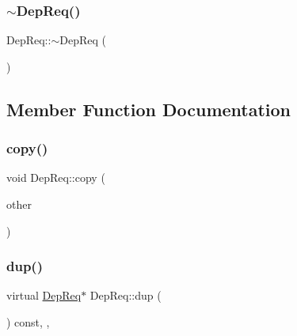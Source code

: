 \subsubsection{\texorpdfstring{$\sim$\+Dep\+Req()}{~DepReq()}}
{\footnotesize\ttfamily Dep\+Req\+::$\sim$\+Dep\+Req (\begin{DoxyParamCaption}{ }\end{DoxyParamCaption})\hspace{0.3cm}{\ttfamily [virtual]}}



\subsection{Member Function Documentation}
\mbox{\label{class_dep_req_a3ec88f2216d73f6b499ae6653a60437b}} 
\subsubsection{\texorpdfstring{copy()}{copy()}}
{\footnotesize\ttfamily void Dep\+Req\+::copy (\begin{DoxyParamCaption}\item[{const \hyperlink{class_dep_req}{Dep\+Req} \&}]{other }\end{DoxyParamCaption})\hspace{0.3cm}{\ttfamily [private]}}

\mbox{\label{class_dep_req_a430632dbd4f70a3a1183f226f0484bf3}} 
\subsubsection{\texorpdfstring{dup()}{dup()}}
{\footnotesize\ttfamily virtual \hyperlink{class_dep_req}{Dep\+Req}$\ast$ Dep\+Req\+::dup (\begin{DoxyParamCaption}{ }\end{DoxyParamCaption}) const\hspace{0.3cm}{\ttfamily [inline]}, {\ttfamily [override]}, {\ttfamily [virtual]}}

\mbox{\label{class_dep_req_a42fa35b3ced2cd9a4afd0ddeade48c19}} 
